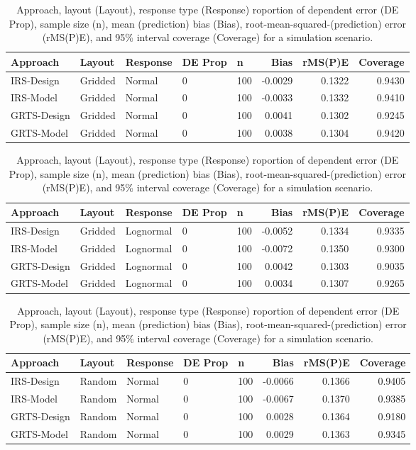 \documentclass[]{elsarticle} %
\begin{document}
\begin{table}[ht]
\centering
\begin{tabular}{lllllrrr}
  \hline
Approach & Layout & Response & DE Prop & n & Bias & rMS(P)E & Coverage \\ 
  \hline
IRS-Design & Gridded & Normal & 0 & 100 & -0.0029 & 0.1322 & 0.9430 \\ 
  IRS-Model & Gridded & Normal & 0 & 100 & -0.0033 & 0.1332 & 0.9410 \\ 
  GRTS-Design & Gridded & Normal & 0 & 100 & 0.0041 & 0.1302 & 0.9245 \\ 
  GRTS-Model & Gridded & Normal & 0 & 100 & 0.0038 & 0.1304 & 0.9420 \\ 
   \hline
\end{tabular}
\caption{Approach, layout (Layout), response type (Response) roportion of dependent error (DE Prop), sample size (n), mean (prediction) bias (Bias), root-mean-squared-(prediction) error (rMS(P)E), and 95\% interval coverage (Coverage) for a simulation scenario.} 
\end{table}
\begin{table}[ht]
\centering
\begin{tabular}{lllllrrr}
  \hline
Approach & Layout & Response & DE Prop & n & Bias & rMS(P)E & Coverage \\ 
  \hline
IRS-Design & Gridded & Lognormal & 0 & 100 & -0.0052 & 0.1334 & 0.9335 \\ 
  IRS-Model & Gridded & Lognormal & 0 & 100 & -0.0072 & 0.1350 & 0.9300 \\ 
  GRTS-Design & Gridded & Lognormal & 0 & 100 & 0.0042 & 0.1303 & 0.9035 \\ 
  GRTS-Model & Gridded & Lognormal & 0 & 100 & 0.0034 & 0.1307 & 0.9265 \\ 
   \hline
\end{tabular}
\caption{Approach, layout (Layout), response type (Response) roportion of dependent error (DE Prop), sample size (n), mean (prediction) bias (Bias), root-mean-squared-(prediction) error (rMS(P)E), and 95\% interval coverage (Coverage) for a simulation scenario.} 
\end{table}
\begin{table}[ht]
\centering
\begin{tabular}{lllllrrr}
  \hline
Approach & Layout & Response & DE Prop & n & Bias & rMS(P)E & Coverage \\ 
  \hline
IRS-Design & Random & Normal & 0 & 100 & -0.0066 & 0.1366 & 0.9405 \\ 
  IRS-Model & Random & Normal & 0 & 100 & -0.0067 & 0.1370 & 0.9385 \\ 
  GRTS-Design & Random & Normal & 0 & 100 & 0.0028 & 0.1364 & 0.9180 \\ 
  GRTS-Model & Random & Normal & 0 & 100 & 0.0029 & 0.1363 & 0.9345 \\ 
   \hline
\end{tabular}
\caption{Approach, layout (Layout), response type (Response) roportion of dependent error (DE Prop), sample size (n), mean (prediction) bias (Bias), root-mean-squared-(prediction) error (rMS(P)E), and 95\% interval coverage (Coverage) for a simulation scenario.} 
\end{table}
\end{document}
